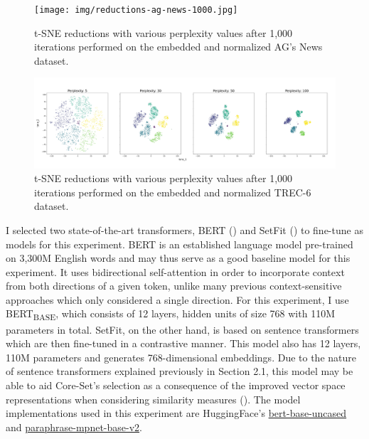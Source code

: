 \documentclass[english,bachelor,ul]{webisthesis} %
\begin{document}
\begin{figure}[htbp]
    \centering
    \texttt{[image: img/reductions-ag-news-1000.jpg]}
    \caption{t-SNE reductions with various perplexity values after 1,000 iterations performed on the embedded and normalized AG's News dataset.}
    \label{fig:reductions-agnews-1000}
\end{figure}

\begin{figure}[htbp]
    \centering
    \includegraphics[width=1\textwidth]{img/reductions-trec-1000.jpg}
    \caption{t-SNE reductions with various perplexity values after 1,000 iterations performed on the embedded and normalized TREC-6 dataset.}
    \label{fig:reductions-trec-1000}
\end{figure}

\fi



I selected two state-of-the-art transformers, BERT (\cite{DBLP:conf/naacl/DevlinCLT19}) and SetFit (\cite{DBLP:setfit}) to fine-tune as models for this experiment. BERT is an established language model pre-trained on 3,300M English words and may thus serve as a good baseline model for this experiment. It uses bidirectional self-attention in order to incorporate context from both directions of a given token, unlike many previous context-sensitive approaches which only considered a single direction. For this experiment, I use BERT\textsubscript{BASE}, which consists of 12 layers, hidden units of size 768 with 110M parameters in total. SetFit, on the other hand, is based on sentence transformers which are then fine-tuned in a contrastive manner. This model also has 12 layers, 110M parameters and generates 768-dimensional embeddings. Due to the nature of sentence transformers explained previously in Section 2.1, this model may be able to aid Core-Set's selection as a consequence of the improved vector space representations when considering similarity measures (\cite{DBLP:conf/emnlp/ReimersG19}). The model implementations used in this experiment are HuggingFace's \href{https://huggingface.co/google-bert/bert-base-uncased}{bert-base-uncased} and \href{https://huggingface.co/sentence-transformers/paraphrase-mpnet-base-v2}{
paraphrase-mpnet-base-v2}.
\end{document}

